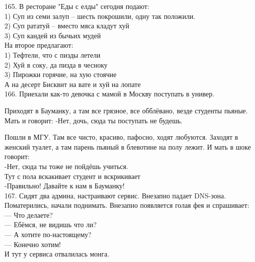 \documentclass[a4paper,20pt,notitlepage]{extbook}
\begin{document}
	165. В ресторане "Еды с елды" сегодня подают:\\
	1) Суп из семи залуп – шесть покрошили, одну так положили.\\
	2) Суп рататуй – вместо мяса кладут хуй\\
	3) Суп кандей из бычьих мудей\\
	На второе предлагают:\\
	1) Тефтели, что с пизды летели\\
	2) Хуй в соку, да пизда в чесноку\\
	3) Пирожки горячие, на хую стоячие\\
	А на десерт Бисквит на вате и хуй на лопате\\
	
	166. Приехали как-то девочка с мамой в Москву поступать в универ.
	
	Приходят в Бауманку, а там все грязное, все обблёвано, везде студенты пьяные. Мать и говорит:
	-Нет, дочь, сюда ты поступать не будешь.
	
	Пошли в МГУ. Там все чисто, красиво, пафосно, ходят любуются. Заходят в женский туалет, а там парень пьяный в блевотине на полу лежит. И мать в шоке говорит:\\
	-Нет, сюда ты тоже не пойдёшь учиться.\\
	Тут с пола вскакивает студент и вскрикивает\\
	-Правильно! Давайте к нам в Бауманку!\\
	
	167. Сидят два админа, настраивают сервис. Внезапно падает DNS-зона. Поматерились, начали поднимать. Внезапно появляется голая фея и спрашивает:\\
	— Что делаете?\\
	— Ебёмся, не видишь что ли?\\
	— А хотите по-настоящему?\\
	— Конечно хотим!\\
	И тут у сервиса отвалилась монга.\\
	
\end{document}
